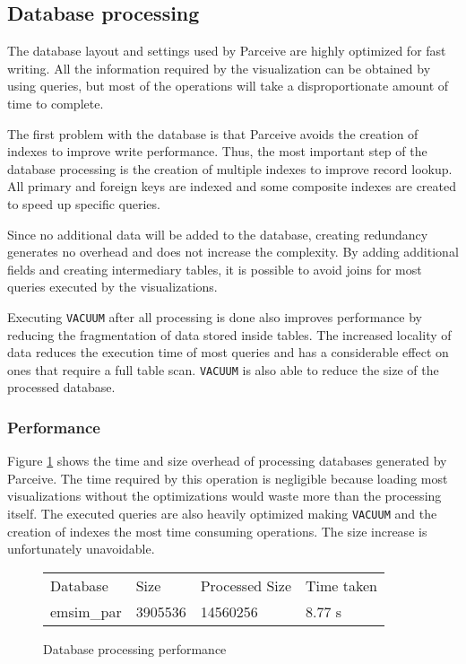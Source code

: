 \documentclass[conference]{IEEEtran}
\begin{document}
\subsection{Database processing}
\label{dataprocessing}

The database layout and settings used by Parceive are highly optimized for fast writing. All the information required by the visualization can be obtained by using queries, but most of the operations will take a disproportionate amount of time to complete.

The first problem with the database is that Parceive avoids the creation of indexes to improve write performance. Thus, the most important step of the database processing is the creation of multiple indexes to improve record lookup. All primary and foreign keys are indexed and some composite indexes are created to speed up specific queries.

Since no additional data will be added to the database, creating redundancy generates no overhead and does not increase the complexity. By adding additional fields and creating intermediary tables, it is possible to avoid joins for most queries executed by the visualizations. 

Executing \texttt{VACUUM} after all processing is done also improves performance by reducing the fragmentation of data stored inside tables. The increased locality of data reduces the execution time of most queries and has a considerable effect on ones that require a full table scan. \texttt{VACUUM} is also able to reduce the size of the processed database.

\subsubsection*{Performance}

Figure \ref{parceive:procperformance} shows the time and size overhead of processing databases generated by Parceive. The time required by this operation is negligible because loading most visualizations without the optimizations would waste more than the processing itself. The executed queries are also heavily optimized making \texttt{VACUUM} and the creation of indexes the most time consuming operations. The size increase is unfortunately unavoidable.

\begin{figure}
	\centering
	\begin{tabular}{l l l l}
		Database & Size & Processed Size & Time taken \\
		emsim\_par & 3905536 & 14560256 & 8.77 s
	\end{tabular}
	\caption{Database processing performance}
	\label{parceive:procperformance}
\end{figure}
\end{document}
